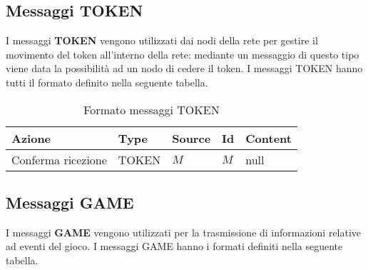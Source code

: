 \documentclass[a4paper]{report}
\begin{document}
\subsection{Messaggi TOKEN}
I messaggi \textbf{TOKEN} vengono utilizzati dai nodi della rete per gestire il movimento del token all'interno della rete: mediante un messaggio di questo tipo viene data la possibilità ad un nodo di cedere il token.\newline
I messaggi TOKEN hanno tutti il formato definito nella seguente tabella.

\begin{table}[H]
	\centering
	\caption{Formato messaggi TOKEN}
	\label{format-token}
	{\renewcommand{\arraystretch}{1.8}
		\begin{tabular}{@{}lllll@{}}
			\toprule
			\rowcolor[HTML]{FFCCC9} 
			{\color[HTML]{333333} Azione} & {\color[HTML]{333333} Type} & {\color[HTML]{333333} Source} & {\color[HTML]{333333} Id} & {\color[HTML]{333333} Content} \\ \midrule
			Conferma ricezione            & TOKEN                         & $M$                  & $M$              & null                           \\ \bottomrule			
		\end{tabular}
	}
\end{table}
\clearpage
\subsection{Messaggi GAME}
I messaggi \textbf{GAME} vengono utilizzati per la trasmissione di informazioni relative ad eventi del gioco.\newline
I messaggi GAME hanno i formati definiti nella seguente tabella.
\end{document}
